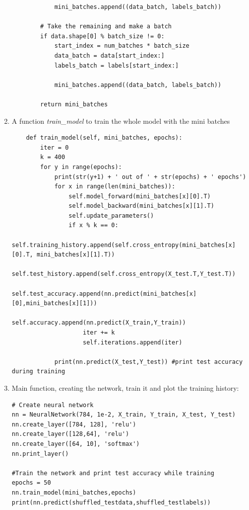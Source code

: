 \documentclass[a4paper,10pt]{article}
\begin{document}
\begin{enumerate}
\begin{lstlisting}
            mini_batches.append((data_batch, labels_batch))

        # Take the remaining and make a batch
        if data.shape[0] % batch_size != 0:
            start_index = num_batches * batch_size
            data_batch = data[start_index:]
            labels_batch = labels[start_index:]

            mini_batches.append((data_batch, labels_batch))

        return mini_batches
\end{lstlisting}
 
    \item A function \emph{train\_model} to train the whole model with the mini batches


\begin{lstlisting}
    def train_model(self, mini_batches, epochs):
        iter = 0
        k = 400
        for y in range(epochs):
            print(str(y+1) + ' out of ' + str(epochs) + ' epochs')
            for x in range(len(mini_batches)): 
                self.model_forward(mini_batches[x][0].T)
                self.model_backward(mini_batches[x][1].T)
                self.update_parameters()
                if x % k == 0:
                    self.training_history.append(self.cross_entropy(mini_batches[x][0].T, mini_batches[x][1].T))
                    self.test_history.append(self.cross_entropy(X_test.T,Y_test.T))
                    self.test_accuracy.append(nn.predict(mini_batches[x][0],mini_batches[x][1]))
                    self.accuracy.append(nn.predict(X_train,Y_train))
                    iter += k
                    self.iterations.append(iter)
                    
            print(nn.predict(X_test,Y_test)) #print test accuracy during training
\end{lstlisting}

\item Main function, creating the network, train it and plot the training history:

\begin{lstlisting}
# Create neural network
nn = NeuralNetwork(784, 1e-2, X_train, Y_train, X_test, Y_test)
nn.create_layer([784, 128], 'relu')
nn.create_layer([128,64], 'relu')
nn.create_layer([64, 10], 'softmax')
nn.print_layer()

#Train the network and print test accuracy while training
epochs = 50
nn.train_model(mini_batches,epochs)   
print(nn.predict(shuffled_testdata,shuffled_testlabels))



\end{lstlisting}
\end{enumerate}
\end{document}
